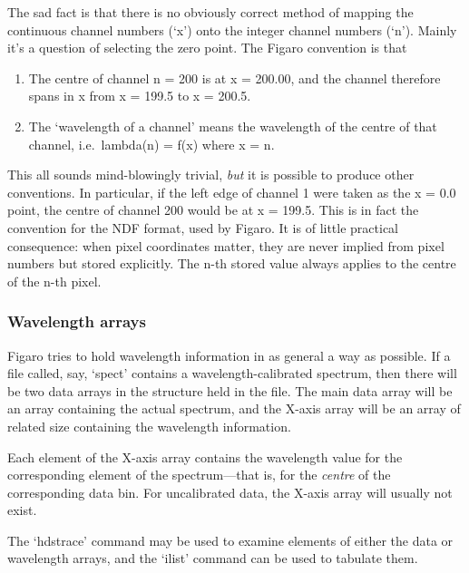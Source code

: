 \documentclass[11pt,twoside]{article}
\newcommand{\latorhtm}[2]{#1}
\newcommand{\latorhtm}[2]{#2}
\begin{document}
   The sad fact is that there is no obviously correct method of mapping
   the continuous channel numbers (`x') onto the integer channel numbers
   (`n').  Mainly it's a question of selecting the zero point.  The
   Figaro convention is that

\begin{enumerate}
\item
   The centre of channel n = 200 is at x = 200.00, and the channel
   therefore spans in x from x = 199.5 to x = 200.5.
\item
   The `wavelength of a channel' means the wavelength of the centre
   of that channel, i.e.\ lambda(n) = f(x) where x = n.
\end{enumerate}

   This all sounds mind-blowingly trivial, {\em but\/}
   it is possible to produce other conventions. In particular, if the
   left edge of channel 1 were taken as the x = 0.0 point, the centre of
   channel 200 would be at x = 199.5. This is in fact the convention for
   the NDF format, used by Figaro. It is of little practical
   consequence: when pixel coordinates matter, they are never implied
   from pixel numbers but stored explicitly. The n-th stored value
   always applies to the centre of the n-th pixel.


\subsubsection{\label{techno8wavearray}Wavelength arrays}

   Figaro tries to hold wavelength information in as general a way as
   possible.  If a file called, say, `spect' contains a
   wavelength-calibrated spectrum, then there will be two data arrays in
   the structure held in the file.  The main data array will be an array
   containing the actual spectrum, and the X-axis array will be an array
   of related size containing the wavelength information.

   Each element of the X-axis array contains the wavelength value for
   the corresponding element of the spectrum\latorhtm{---}{-}that is, for the
{\em centre\/}
   of the corresponding data bin.  For uncalibrated data, the X-axis
   array will usually not exist.

   The `hdstrace' command may be used to examine elements of either the data
   or wavelength arrays, and the `ilist' command can be used to tabulate
   them.
\end{document}

